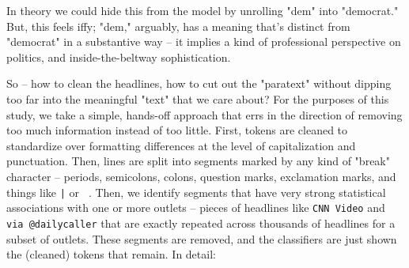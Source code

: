 \documentclass{scrartcl}
\begin{document}
In theory we could hide this from the model by unrolling "dem" into "democrat." But, this feels iffy; "dem," arguably, has a meaning that's distinct from "democrat" in a substantive way -- it implies a kind of professional perspective on politics, and inside-the-beltway sophistication.

So -- how to clean the headlines, how to cut out the "paratext" without dipping too far into the meaningful "text" that we care about? For the purposes of this study, we take a simple, hands-off approach that errs in the direction of removing too much information instead of too little. First, tokens are cleaned to standardize over formatting differences at the level of capitalization and punctuation. Then, lines are split into segments marked by any kind of "break" character -- periods, semicolons, colons, question marks, exclamation marks, and things like \texttt{|} or \texttt{~}. Then, we identify segments that have very strong statistical associations with one or more outlets -- pieces of headlines like \texttt{CNN Video} and \texttt{via @dailycaller} that are exactly repeated across thousands of headlines for a subset of outlets. These segments are removed, and the classifiers are just shown the (cleaned) tokens that remain. In detail:
\end{document}
